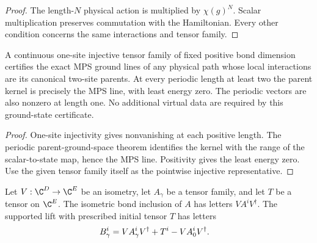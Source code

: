 \begin{proof}\leanok
    The length-$N$ physical action is multiplied by $\chi(g)^N$.
    Scalar multiplication preserves commutation with the Hamiltonian.
    Every other condition concerns the same interactions and tensor family.
\end{proof}

\begin{lemma}
    \label{thm:spt_canonical_injective_ground_path}
    \leanok
    A continuous one-site injective tensor family of fixed positive bond
    dimension certifies the exact MPS ground lines of any physical path
    whose local interactions are its canonical two-site parents.
    At every periodic length at least two the parent kernel is precisely
    the MPS line, with least energy zero. The periodic vectors are also
    nonzero at length one. No additional virtual data are required by
    this ground-state certificate.
\end{lemma}

\begin{proof}\leanok
    One-site injectivity gives nonvanishing at each positive length.
    The periodic parent-ground-space theorem identifies the kernel
    with the range of the scalar-to-state map, hence the MPS line.
    Positivity gives the least energy zero. Use the given tensor family
    itself as the pointwise injective representative.
\end{proof}

\begin{definition}
    \label{def:spt_supported_bond_lift}
    \leanok
    Let $V:\C^D\to\C^E$ be an isometry, let $A_\gamma$ be a tensor
    family, and let $T$ be a tensor on $\C^E$. The isometric bond
    inclusion of $A$ has letters $VA^iV^\dagger$. The supported lift
    with prescribed initial tensor $T$ has letters
    \begin{align}
        B_\gamma^i & =VA_\gamma^iV^\dagger
        +T^i-VA_0^iV^\dagger.
        \notag
    \end{align}
\end{definition}

